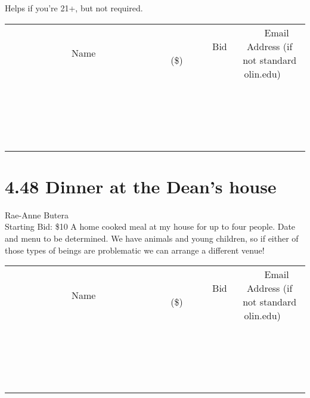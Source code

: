 \documentclass[11pt]{article}
\begin{document}
Helps if you're 21+, but not required.
\\[3ex]
\begin{tabular}{c c c}
~~~~~~~~~~~~~Name~~~~~~~~~~~~~ & ~~~~~~~~~Bid (\$)~~~~~~~~~  & ~~~Email Address (if not standard olin.edu)~~~\\
 & & \\
\hline
 & & \\
\hline
 & & \\
\hline
 & & \\
\hline
 & & \\
\hline
 & & \\
\hline
 & & \\
\hline
 & & \\
\hline
 & & \\
\hline
 & & \\
\hline
 & & \\
\hline
 & & \\
\hline
 & & \\
\hline
 & & \\
\hline
 & & \\
\hline
 & & \\
\hline
 & & \\
\hline
 & & \\
\hline
 & & \\
\hline
\end{tabular}
\newpage
\section*{4.48 Dinner at the Dean's house}
Rae-Anne Butera
\\
Starting Bid: \$10
\newline
A home cooked meal at my house for up to four people. Date and menu to be determined. We have animals and young children, so if either of those types of beings are problematic we can arrange a different venue!
\\[3ex]
\begin{tabular}{c c c}
~~~~~~~~~~~~~Name~~~~~~~~~~~~~ & ~~~~~~~~~Bid (\$)~~~~~~~~~  & ~~~Email Address (if not standard olin.edu)~~~\\
 & & \\
\hline
 & & \\
\hline
 & & \\
\hline
 & & \\
\hline
 & & \\
\hline
 & & \\
\hline
 & & \\
\hline
 & & \\
\hline
 & & \\
\hline
 & & \\
\hline
 & & \\
\hline
 & & \\
\hline
 & & \\
\hline
 & & \\
\hline
 & & \\
\hline
 & & \\
\hline
 & & \\
\hline
 & & \\
\hline
 & & \\
\hline
\end{tabular}
\newpage
\end{document}
